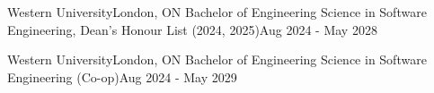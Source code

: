 \resumeSubheading
  {Western University}{London, ON}
  {Bachelor of Engineering Science in Software Engineering, Dean's Honour List (2024, 2025)}{Aug 2024 - May 2028}

\resumeSubheading
  {Western University}{London, ON}
  {Bachelor of Engineering Science in Software Engineering (Co-op)}{Aug 2024 - May 2029}


